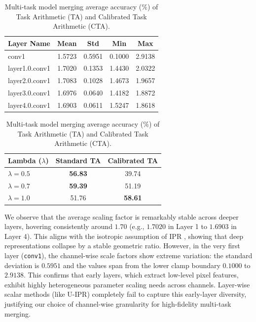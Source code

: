 \documentclass{article}
\theoremstyle{plain}
\theoremstyle{definition}
\theoremstyle{remark}
\begin{document}
\begin{table}[tb]
  \centering
  \vspace{-8pt}
  \caption{Statistics of UCPC channel-wise scale factors ($\gamma_c$) across key layers in ResNet-18.}
  \label{tab:gamma_distributions}
  \vskip 0.01in
  \begin{small}
    \begin{sc}
      \setlength{\tabcolsep}{3pt}
      \begin{tabular}{lcccc}
        \toprule
        Layer Name & Mean & Std & Min & Max \\
        \midrule
        conv1 & 1.5723 & 0.5951 & 0.1000 & 2.9138 \\
        layer1.0.conv1 & 1.7020 & 0.1353 & 1.4430 & 2.0322 \\
        layer2.0.conv1 & 1.7083 & 0.1028 & 1.4673 & 1.9657 \\
        layer3.0.conv1 & 1.6976 & 0.0640 & 1.4182 & 1.8872 \\
        layer4.0.conv1 & 1.6903 & 0.0611 & 1.5247 & 1.8618 \\
        \bottomrule
      \end{tabular}
    \end{sc}
  \end{small}
  \vskip 0.01in
  \caption{Multi-task model merging average accuracy (\%) of Task Arithmetic (TA) and Calibrated Task Arithmetic (CTA).}
  \label{tab:cta_results}
  \vskip 0.01in
  \begin{small}
    \begin{sc}
      \setlength{\tabcolsep}{4pt}
      \begin{tabular}{lcc}
        \toprule
        Lambda ($\lambda$) & Standard TA & Calibrated TA \\
        \midrule
        $\lambda = 0.5$ & \textbf{56.83} & 39.74 \\
        $\lambda = 0.7$ & \textbf{59.39} & 51.19 \\
        $\lambda = 1.0$ & 51.76 & \textbf{58.61} \\
        \bottomrule
      \end{tabular}
    \end{sc}
  \end{small}
  \vspace{-15pt}
\end{table}

We observe that the average scaling factor is remarkably stable across deeper layers, hovering consistently around $1.70$ (e.g., $1.7020$ in Layer 1 to $1.6903$ in Layer 4). This aligns with the isotropic assumption of IPR \cite{anonymous26c}, showing that deep representations collapse by a stable geometric ratio.
However, in the very first layer (\texttt{conv1}), the channel-wise scale factors show extreme variation: the standard deviation is $0.5951$ and the values span from the lower clamp boundary $0.1000$ to $2.9138$. This confirms that early layers, which extract low-level pixel features, exhibit highly heterogeneous parameter scaling needs across channels. Layer-wise scalar methods (like U-IPR) completely fail to capture this early-layer diversity, justifying our choice of channel-wise granularity for high-fidelity multi-task merging.
\end{document}
